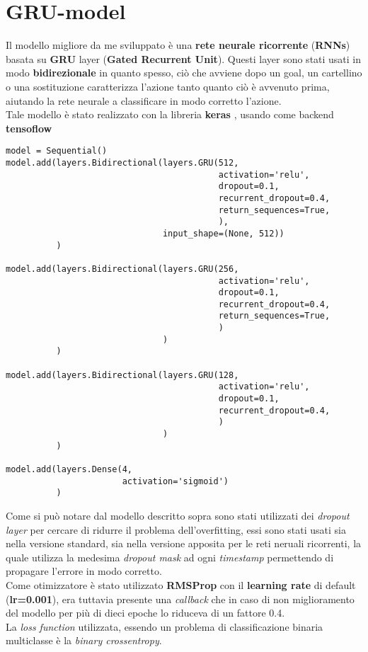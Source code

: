 \section{GRU-model}
\label{section : grumodel}
Il modello migliore da me sviluppato è una \textbf{rete neurale ricorrente} (\textbf{RNNs}) basata su \textbf{GRU} layer (\textbf{Gated Recurrent Unit}). Questi layer sono stati usati in modo \textbf{bidirezionale} in quanto spesso, ciò che avviene dopo un goal, un cartellino o una sostituzione caratterizza l'azione tanto quanto ciò è avvenuto prima, aiutando la rete neurale a classificare in modo corretto l'azione. \cite{DeepLearningPython}
\\Tale modello è stato realizzato con la libreria \textbf{keras} \cite{chollet2015keras}, usando come backend \textbf{tensoflow} \cite{tensorflow2015-whitepaper}
\begin{verbatim}
model = Sequential()
model.add(layers.Bidirectional(layers.GRU(512,
                                          activation='relu',
                                          dropout=0.1,
                                          recurrent_dropout=0.4,
                                          return_sequences=True,
                                          ),
                               input_shape=(None, 512))
          )

model.add(layers.Bidirectional(layers.GRU(256,
                                          activation='relu',
                                          dropout=0.1,
                                          recurrent_dropout=0.4,
                                          return_sequences=True,
                                          )
                               )
          )

model.add(layers.Bidirectional(layers.GRU(128,
                                          activation='relu',
                                          dropout=0.1,
                                          recurrent_dropout=0.4,
                                          )
                               )
          )

model.add(layers.Dense(4,
                       activation='sigmoid')
          )
\end{verbatim}
Come si può notare dal modello descritto sopra sono stati utilizzati dei \textit{dropout layer} per cercare di ridurre il problema dell'overfitting, essi sono stati usati sia nella versione standard, sia nella versione apposita per le reti neruali ricorrenti, la quale utilizza la medesima \textit{dropout mask} ad ogni \textit{timestamp} permettendo di propagare l'errore in modo corretto. \cite{DeepLearningPython}
\\Come otimizzatore è stato utilizzato \textbf{RMSProp} con il \textbf{learning rate} di default (\textbf{lr=0.001}), era tuttavia presente una \textit{callback} che in caso di non miglioramento del modello per più di dieci epoche lo riduceva di un fattore 0.4.
\\La \textit{loss function} utilizzata, essendo un problema di classificazione binaria multiclasse è la \textit{binary crossentropy}.
